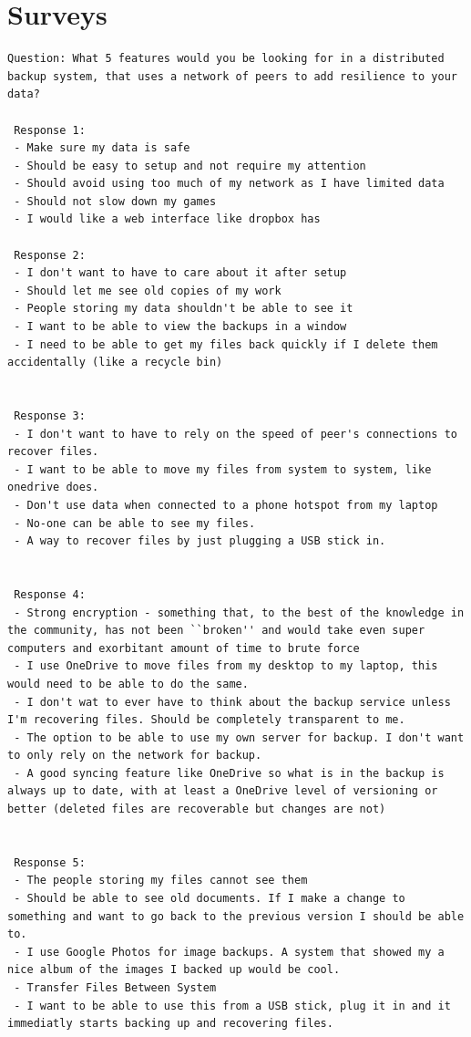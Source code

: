 \documentclass[11pt, a4paper, twoside]{report}
\begin{document}
\section{Surveys}

\begin{lstlisting}[language=RsT, caption=Membrane Feature Survey, label=lst:mbrnsurvey]
 Question: What 5 features would you be looking for in a distributed backup system, that uses a network of peers to add resilience to your data?
   
 Response 1:
 - Make sure my data is safe
 - Should be easy to setup and not require my attention
 - Should avoid using too much of my network as I have limited data
 - Should not slow down my games
 - I would like a web interface like dropbox has 
  
 Response 2:
 - I don't want to have to care about it after setup
 - Should let me see old copies of my work
 - People storing my data shouldn't be able to see it
 - I want to be able to view the backups in a window
 - I need to be able to get my files back quickly if I delete them accidentally (like a recycle bin)
 
  
 Response 3:
 - I don't want to have to rely on the speed of peer's connections to recover files.
 - I want to be able to move my files from system to system, like onedrive does.
 - Don't use data when connected to a phone hotspot from my laptop
 - No-one can be able to see my files.
 - A way to recover files by just plugging a USB stick in.
 
  
 Response 4:
 - Strong encryption - something that, to the best of the knowledge in the community, has not been ``broken'' and would take even super computers and exorbitant amount of time to brute force
 - I use OneDrive to move files from my desktop to my laptop, this would need to be able to do the same.
 - I don't wat to ever have to think about the backup service unless I'm recovering files. Should be completely transparent to me.
 - The option to be able to use my own server for backup. I don't want to only rely on the network for backup.
 - A good syncing feature like OneDrive so what is in the backup is always up to date, with at least a OneDrive level of versioning or better (deleted files are recoverable but changes are not)
 
  
 Response 5:
 - The people storing my files cannot see them
 - Should be able to see old documents. If I make a change to something and want to go back to the previous version I should be able to.
 - I use Google Photos for image backups. A system that showed my a nice album of the images I backed up would be cool.
 - Transfer Files Between System
 - I want to be able to use this from a USB stick, plug it in and it immediatly starts backing up and recovering files.
 

\end{lstlisting}
\end{document}
